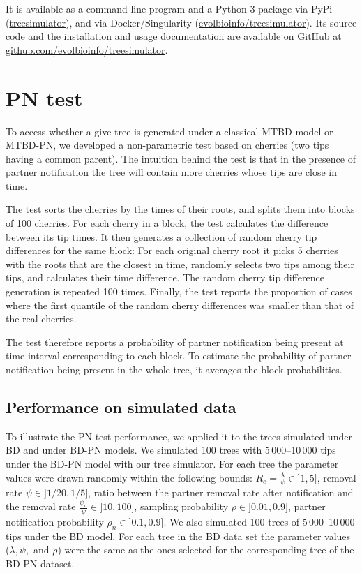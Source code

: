\documentclass[a4paper,10pt]{article}
\begin{document}
It is available as a command-line program and a Python 3 package via PyPi (\href{https://pypi.org/project/treesimulator}{treesimulator}), and via Docker/Singularity (\href{https://hub.docker.com/r/evolbioinfo/treesimulator/tags}{evolbioinfo/treesimulator}). Its source code and the installation and usage documentation are available on GitHub at \href{https://github.com/evolbioinfo/treesimulator}{github.com/evolbioinfo/treesimulator}.


\section{PN test}
To access whether a give tree is generated under a classical MTBD model or MTBD-PN, we developed a non-parametric test based on cherries (two tips having a common parent). 
The intuition behind the test is that in the presence of partner notification the tree will contain more cherries whose tips are close in time. 

The test sorts the cherries by the times of their roots, and splits them into blocks of 100 cherries. For each cherry in a block, the test calculates the difference between its tip times. It then generates a collection of random cherry tip differences for the same block: For each original cherry root it picks 5 cherries with the roots that are the closest in time, randomly selects two tips among their tips, and calculates their time difference. The random cherry tip difference generation is repeated 100 times. Finally, the test reports the proportion of cases where the first quantile of the random cherry differences was smaller than that of the real cherries. 

The test therefore reports a probability of partner notification being present at time interval corresponding to each block. To estimate the probability of partner notification being present in the whole tree, it averages the block probabilities. 


\subsection{Performance on simulated data}
To illustrate the PN test performance, we applied it to the trees simulated under BD and under BD-PN models. We simulated 100 trees with 5\,000--10\,000 tips under the BD-PN model with our tree simulator. For each tree the parameter values were drawn randomly within the following bounds:
$R_e = \frac{{\lambda}}{{\psi}} \in ]1, 5]$, 
removal rate $\psi \in ]1 / 20, 1 / 5]$,
ratio between the partner removal rate after notification and the removal rate $\frac{\psi_n}{\psi} \in ]10, 100]$,
sampling probability $\rho \in ]0.01, 0.9]$,
partner notification probability $\rho_n \in ]0.1, 0.9]$. We also simulated 100 trees of 5\,000--10\,000 tips under the BD model. For each tree in the BD data set the parameter values ($\lambda, \psi,$ and $\rho$) were the same as the ones selected for the corresponding tree of the BD-PN dataset.
\end{document}
